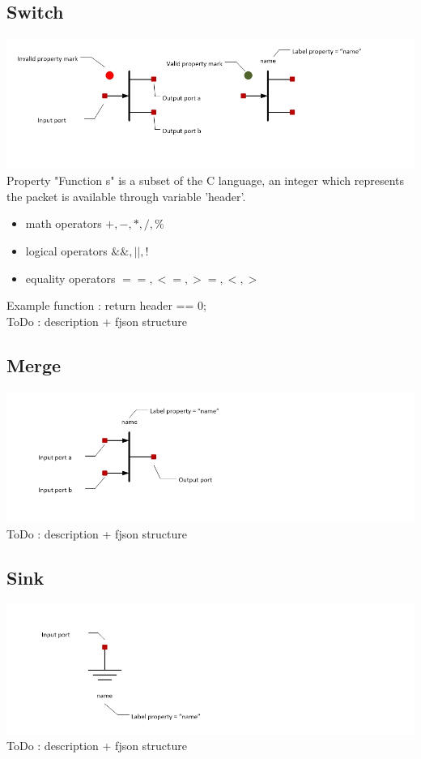 \documentclass[a4paper,11pt,final]{article}
\begin{document}
\subsection{Switch}
\includegraphics[width=1.0\textwidth]{switch}
\\Property "Function s" is a subset of the C language, an integer which represents the packet is available through variable 'header'. 
\begin{itemize}
\item math operators $+,-,*,/,\%$
\item logical operators $\&\&,||,!$
\item equality operators $==,<=,>=,<,>$
\end{itemize} 
Example function : return header == 0;
\\ToDo : description + fjson structure  
\subsection{Merge}
\includegraphics[width=1.0\textwidth]{merge}
\\ToDo : description + fjson structure
\subsection{Sink}
\includegraphics[width=1.0\textwidth]{sink}
\\ToDo : description + fjson structure
\end{document}
